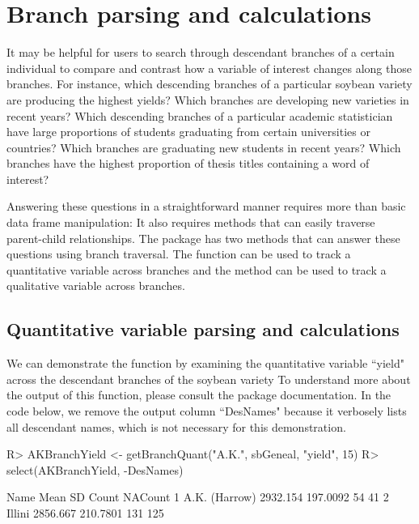 \documentclass[article,shortnames]{jss}
\begin{document}
\section{Branch parsing and calculations}

It may be helpful for users to search through descendant branches of a certain individual to compare and contrast how a variable of interest changes along those branches. For instance, which descending branches of a particular soybean variety are producing the highest yields? Which branches are developing new varieties in recent years? Which descending branches of a particular academic statistician have large proportions of students graduating from certain universities or countries? Which branches are graduating new students in recent years? Which branches have the highest proportion of thesis titles containing a word of interest?

Answering these questions in a straightforward manner requires more than basic data frame manipulation: It also requires methods that can easily traverse parent-child relationships. The  package has two methods that can answer these questions using branch traversal. The  function can be used to track a quantitative variable across branches and the  method can be used to track a qualitative variable across branches.

\clearpage
\subsection{Quantitative variable parsing and calculations}

We can demonstrate the  function by examining the quantitative variable ``yield" across the descendant branches of the soybean variety  To understand more about the output of this function, please consult the  package documentation. In the code below, we remove the output column ``DesNames" because it verbosely lists all descendant names, which is not necessary for this demonstration.

\begin{CodeChunk}
\begin{CodeInput}
R> AKBranchYield <- getBranchQuant("A.K.", sbGeneal, "yield", 15)
R> select(AKBranchYield, -DesNames)
\end{CodeInput}
\begin{CodeOutput}
           Name     Mean       SD Count NACount
1 A.K. (Harrow) 2932.154 197.0092    54      41
2        Illini 2856.667 210.7801   131     125
\end{CodeOutput}
\end{CodeChunk}
\end{document}
